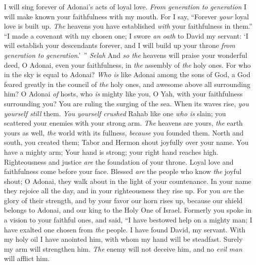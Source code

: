 \begin{biblechapter} %
 I will sing forever of Adonai’s acts of loyal love. 
\textit{From generation to generation} 
I will make known your faithfulness with my mouth.
\verse For I say, “Forever \textit{your} loyal love is built up. 
\textit{The} heavens you have established \textit{with} your faithfulness in them.”
\verse “I made a covenant with my chosen one; 
I swore \textit{an oath} to David my servant:
\verse ‘I will establish your descendants forever, 
and I will build up your throne \textit{from generation to generation}.’ ” \textit{Selah}
\verse And \textit{so the} heavens will praise your wonderful deed, O Adonai, 
even your faithfulness, in \textit{the} assembly of \textit{the} holy ones.
\verse For who in the sky is equal to Adonai? 
\textit{Who is} like Adonai among the sons of God,
\verse a God feared greatly in the council of \textit{the} holy ones, 
and awesome above all surrounding him?
\verse O Adonai \textit{of} hosts, 
who \textit{is} mighty like you, O Yah, 
with your faithfulness surrounding you?
\verse You are ruling the surging of the sea. 
When its waves rise, \textit{you yourself still} them.
\verse \textit{You yourself crushed} Rahab like one \textit{who is} slain; 
you scattered your enemies with your strong arm.
\verse \textit{The} heavens are yours, \textit{the} earth yours as well, 
\textit{the} world with its fullness, \textit{because} you founded them.
\verse North and south, you created them; 
Tabor and Hermon shout joyfully over your name.
\verse You have a mighty arm; 
Your hand is strong; your right hand reaches high.
\verse Righteousness and justice \textit{are} the foundation of your throne. 
Loyal love and faithfulness come before your face.
\verse Blessed \textit{are} the people who know \textit{the} joyful shout; 
O Adonai, they walk about in the light of your countenance.
\verse In your name they rejoice all the day, 
and in your righteousness they rise up.
\verse For you \textit{are} the glory of their strength, 
and by your favor our horn rises up,
\verse because our shield belongs to Adonai, 
and our king to the Holy One of Israel.
\verse Formerly you spoke in a vision 
to your faithful ones, and said, 
“I have bestowed help on a mighty man; 
I have exalted one chosen from \textit{the} people.
\verse I have found David, my servant. 
With my holy oil I have anointed him,
\verse with whom my hand will be steadfast. 
Surely my arm will strengthen him.
\verse \textit{The} enemy will not deceive him, 
and no \textit{evil man} will afflict him.

\end{biblechapter}
